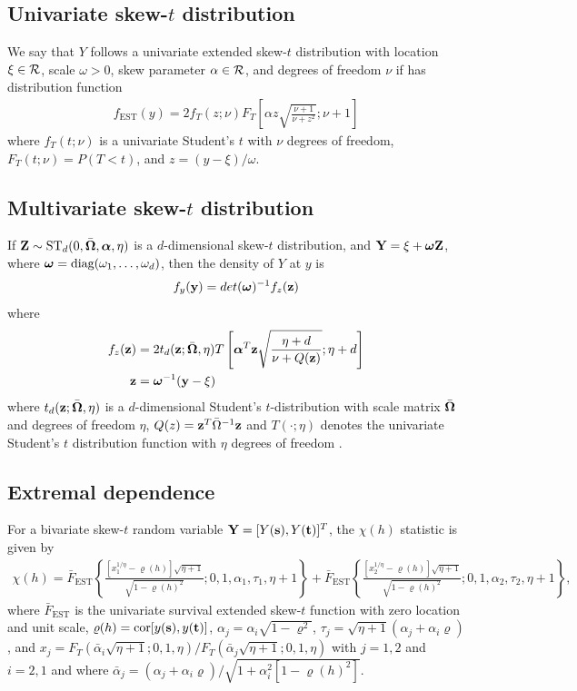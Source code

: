 \documentclass[useAMS,usenatbib,referee]{biomweb}
\begin{document}
\subsection*{Univariate skew-$t$ distribution}
We say that $Y$ follows a univariate extended skew-$t$ distribution with location $\xi \in \calR$, scale $\omega > 0$, skew parameter $\alpha \in \calR$, and degrees of freedom $\nu$ if has distribution function
\begin{align}
  f_{\text{EST}}(y) = 2 f_T (z; \nu) F_T\left[ \alpha z \sqrt{ \frac{ \nu + 1 }{ \nu + z^2}}; \nu + 1 \right]
\end{align}
where $f_T(t; \nu)$ is a univariate Student's $t$ with $\nu$ degrees of freedom, $F_T(t; \nu) = P(T < t)$, and \hbox{$z = (y - \xi) / \omega$}.

\subsection*{Multivariate skew-$t$ distribution}
If $\mbox{\bf Z} \sim \text{ST}_d(0, \bar{\mbox{\boldmath $\Omega$}}, \mbox{\boldmath $\alpha$}, \eta)$ is a $d$-dimensional skew-$t$ distribution, and $\mbox{\bf Y} = \xi + \mbox{\boldmath $\omega$} \mbox{\bf Z}$, where $\mbox{\boldmath $\omega$} = \text{diag}(\omega_1, \ldots, \omega_d)$, then the density of $Y$ at $y$ is
\begin{align}
  f_y(\mbox{\bf y}) = det(\mbox{\boldmath $\omega$})^{-1} f_z(\mbox{\bf z})
\end{align}
where
\begin{align}
  f_z(\mbox{\bf z}) &= 2 t_d(\mbox{\bf z}; \bar{\mbox{\boldmath $\Omega$}}, \eta) T \left[ \mbox{\boldmath $\alpha$}^T \mbox{\bf z} \sqrt{ \frac{\eta + d}{\nu + Q(\mbox{\bf z})} }; \eta + d\right] \\
  \mbox{\bf z} &= \mbox{\boldmath $\omega$}^{-1}(\mbox{\bf y} - \xi)
\end{align}
where $t_d(\mbox{\bf z}; \bar{\mbox{\boldmath $\Omega$}}, \eta)$ is a $d$-dimensional Student's $t$-distribution with scale matrix $\bar{\mbox{\boldmath $\Omega$}}$ and degrees of freedom $\eta$, $Q(z) = \mbox{\bf z}^T \bar{\Omega}^{-1}\mbox{\bf z}$ and $T(\cdot; \eta)$ denotes the univariate Student's $t$ distribution function with $\eta$ degrees of freedom \citep{Azzalini2014}.


\subsection*{Extremal dependence}
For a bivariate skew-$t$ random variable $\mbox{\bf Y} = [Y(\mbox{\bf s}), Y(\mbox{\bf t})]^T$, the $\chi(h)$ statistic \citep{Padoan2011} is given by
\begin{align} \label{eq:chiskew-t}
  \chi(h) = \bar{F}_{\text{EST}}\left\{ \frac{[x_1^{1 / \eta} - \varrho(h)] \sqrt{\eta + 1} }{\sqrt{1 - \varrho(h)^2}}; 0, 1, \alpha_1, \tau_1, \eta + 1 \right\} + \bar{F}_{\text{EST}}\left\{ \frac{ [x_2^{1 / \eta} - \varrho(h)] \sqrt{\eta + 1} }{ \sqrt{1 - \varrho(h)^2} }; 0, 1, \alpha_2, \tau_2, \eta + 1 \right\},
\end{align}
where $\bar{F}_{\text{EST}}$ is the univariate survival extended skew-$t$ function with zero location and unit scale, \hbox{$\varrho(h) = \text{cor}[y(\mbox{\bf s}), y(\mbox{\bf t})]$}, $\alpha_j = \alpha_i \sqrt{1 - \varrho^2}$, $\tau_j = \sqrt{\eta + 1}(\alpha_j + \alpha_i \varrho)$, and $x_j = F_T(\bar{\alpha}_i \sqrt{\eta + 1}; 0, 1, \eta) / F_T(\bar{\alpha}_j \sqrt{\eta + 1}; 0, 1, \eta)$ with $j = 1, 2$ and $i = 2, 1$ and where $\bar{\alpha}_j = (\alpha_j + \alpha_i \varrho) / \sqrt{ 1 + \alpha_i^2 [1 - \varrho(h)^2]}$.
\end{document}
